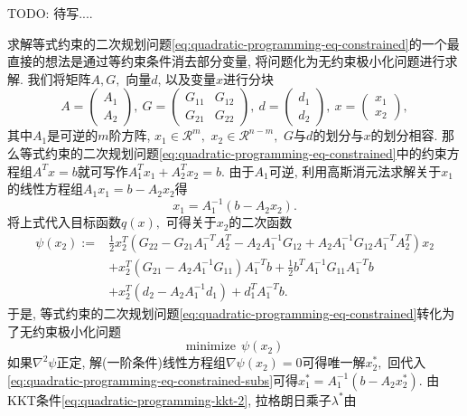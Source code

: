 \documentclass{SBCbookchapter}
\newcommand{\R}{\mathcal{R}}
\begin{document}
TODO: 待写....

求解等式约束的二次规划问题\eqref{eq:quadratic-programming-eq-constrained}的一个最直接的想法是通过等约束条件消去部分变量, 将问题化为无约束极小化问题进行求解. 我们将矩阵$A, G,$ 向量$d$, 以及变量$x$进行分块
\begin{equation*}
A = \begin{pmatrix} A_1 \\ A_2 \end{pmatrix}, ~ G = \begin{pmatrix} G_{11} & G_{12} \\ G_{21} & G_{22} \end{pmatrix}, ~ d = \begin{pmatrix} d_1 \\ d_2 \end{pmatrix}, ~ x = \begin{pmatrix} x_1 \\ x_2 \end{pmatrix},
\end{equation*}
其中$A_1$是可逆的$m$阶方阵, $x_1 \in \R^{m},$ $x_2 \in \R^{n-m},$ $G$与$d$的划分与$x$的划分相容. 那么等式约束的二次规划问题\eqref{eq:quadratic-programming-eq-constrained}中的约束方程组$A^T x = b$就可写作$A_1^T x_1 + A_2^T x_2 = b.$ 由于$A_1$可逆, 利用高斯消元法求解关于$x_1$的线性方程组$A_1x_1 = b - A_2x_2$得
\begin{equation}
\label{eq:quadratic-programming-eq-constrained-subs}
x_1 = A_1^{-1} (b - A_2x_2).
\end{equation}
将上式代入目标函数$q(x),$ 可得关于$x_2$的二次函数
\begin{equation}
\begin{aligned}
\psi (x_2) := & \frac{1}{2} x_2^T \left( G_{22} - G_{21} A_1^{-T} A_2^T - A_2 A_1^{-1} G_{12} + A_2 A_1^{-1} G_{12} A_1^{-T} A_2^T \right) x_2 \\
& + x_2^T \left( G_{21} - A_2 A_1^{-1} G_{11} \right) A_1^{-T} b + \frac{1}{2} b^T A_1^{-1} G_{11} A_1^{-T} b \\
& + x_2^T \left( d_2 - A_2 A_1^{-1} d_1 \right) + d_1^T A_1^{-T} b.
\end{aligned}
\end{equation}
于是, 等式约束的二次规划问题\eqref{eq:quadratic-programming-eq-constrained}转化为了无约束极小化问题
\begin{equation*}
\text{minimize} ~~ \psi(x_2)
\end{equation*}
如果$\nabla^2 \psi$正定, 解(一阶条件)线性方程组$\nabla \psi (x_2) = 0$可得唯一解$x_2^*,$ 回代入\eqref{eq:quadratic-programming-eq-constrained-subs}可得$x_1^* = A_1^{-1} (b - A_2x_2^*).$ 由KKT条件\eqref{eq:quadratic-programming-kkt-2}, 拉格朗日乘子$\lambda^*$由
\end{document}

